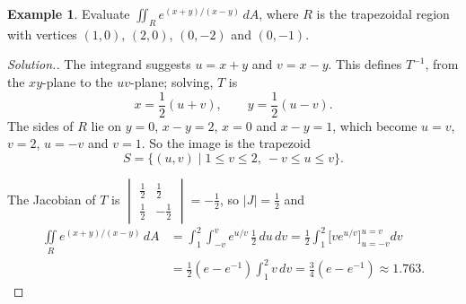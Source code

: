 \documentclass[11pt,a4paper]{article}
\theoremstyle{definition}
\newtheorem{exa}[thm]{Example}
\newenvironment{solution}
  {\renewcommand{\qedsymbol}{}\begin{proof}[\textit{Solution}.]}
  {\end{proof}}
\begin{document}
\begin{exa}
\label{ex:trapezoid}
Evaluate $\iint_R e^{(x+y)/(x-y)}\,dA$, where $R$ is the trapezoidal region with
vertices $(1,0)$, $(2,0)$, $(0,-2)$ and $(0,-1)$.

\begin{figure}[H]
\centering
{}
\end{figure}
\end{exa}

\begin{solution}
The integrand suggests $u = x + y$ and $v = x - y$. This defines $T^{-1}$, from
the $xy$-plane to the $uv$-plane; solving, $T$ is
\[x = \frac{1}{2}(u+ v),\qquad y = \frac{1}{2}(u- v) .\]
The sides of $R$ lie on $y = 0$, $x - y = 2$, $x = 0$ and $x - y = 1$, which
become $u = v$, $v = 2$, $u = -v$ and $v = 1$. So the image is the trapezoid
\[S = \{ (u,v) \mid 1\leq v \leq 2,\ -v \leq u \leq v\} .\]

\begin{figure}[H]
\centering
{}
\end{figure}

The Jacobian of $T$ is
$\begin{vmatrix} \frac12 & \frac12\\ \frac12 & -\frac12\end{vmatrix} =
-\frac12$, so $|J| = \frac12$ and
\begin{align*}
\iint\limits_R e^{(x+y)/(x-y)}\,dA & = \int^2_1 \int^v_{-v} e^{u/v}\, \frac{1}{2}\,
du\, dv = \frac{1}{2}\int^2_1 \Big[ve^{u/v}\Big]_{u=-v}^{u=v}dv\\
& = \frac{1}{2}( e - e^{-1})\int^2_1 v \,dv = \frac{3}{4}( e - e^{-1})\approx
1.763 .
\end{align*}
\end{solution}
\end{document}
